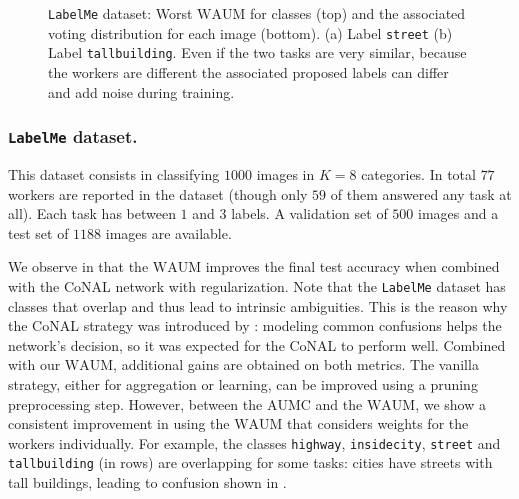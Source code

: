 \begin{figure}[t]
    \label{fig:labelme_worstWAUM}%
    \centering
    \hfill
    \hfill
    \caption{\texttt{LabelMe} dataset: Worst $\mathrm{WAUM}$ for classes (top) and the associated voting distribution for each image (bottom). (a) Label \texttt{street} (b)  Label \texttt{tallbuilding}.
        Even if the two tasks are very similar, because the workers are different the associated proposed labels can differ and add noise during training.}
\end{figure}

\subsubsection{\texttt{LabelMe} dataset.} This dataset consists in classifying $1000$ images in $K=8$ categories.
In total $77$ workers are reported in the dataset (though only $59$ of them answered any task at all).
Each task has between $1$ and $3$ labels. A validation set of $500$ images and a test set of $1188$ images are available.

We observe in  that the $\mathrm{WAUM}$ improves the final test accuracy when combined with the CoNAL network with regularization.
Note that the \texttt{LabelMe} dataset has classes that overlap and thus lead to intrinsic ambiguities.
This is the reason why the CoNAL strategy was introduced by \citet{chu2021learning}: modeling common confusions helps the network's decision, so it was expected for the CoNAL to perform well.
Combined with our $\mathrm{WAUM}$, additional gains are obtained on both metrics.
The vanilla strategy, either for aggregation or learning, can be improved using a pruning preprocessing step.
However, between the $\mathrm{AUMC}$ and the $\mathrm{WAUM}$, we show a consistent improvement in using the $\mathrm{WAUM}$ that considers weights for the workers individually.
For example, the classes \texttt{highway}, \texttt{insidecity}, \texttt{street} and \texttt{tallbuilding} (in rows) are overlapping for some tasks: cities have streets with tall buildings, leading to confusion shown in .

